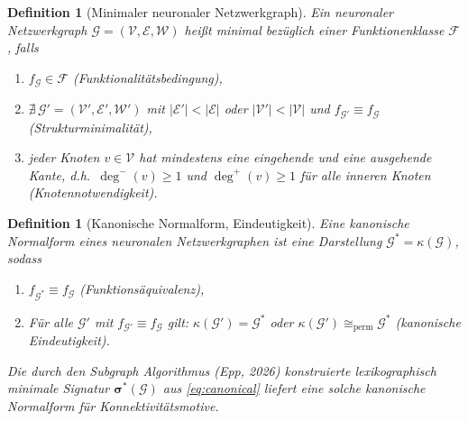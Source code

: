 ﻿\documentclass[12pt, a4paper, openany]{report}
\newtheorem{definition}[theorem]{Definition}
\newcommand{\calG}{\mathcal{G}}
\newcommand{\calV}{\mathcal{V}}
\newcommand{\calE}{\mathcal{E}}
\newcommand{\calW}{\mathcal{W}}
\newcommand{\calF}{\mathcal{F}}
\begin{document}
\begin{definition}[Minimaler neuronaler Netzwerkgraph]
\label{def:minimal_nngraph}
Ein neuronaler Netzwerkgraph $\calG = (\calV, \calE, \calW)$ heißt
\emph{minimal} bezüglich einer Funktionenklasse $\calF$, falls
\begin{enumerate}[label=(\roman*)]
  \item $f_\calG \in \calF$ (Funktionalitätsbedingung),
  \item $\nexists\, \calG' = (\calV', \calE', \calW')$ mit
        $|\calE'| < |\calE|$ oder $|\calV'| < |\calV|$ und
        $f_{\calG'} \equiv f_\calG$ (Strukturminimalität),
  \item jeder Knoten $v \in \calV$ hat mindestens eine eingehende und eine
        ausgehende Kante, d.h.\ $\deg^-(v) \geq 1$ und $\deg^+(v) \geq 1$
        für alle inneren Knoten (Knotennotwendigkeit).
\end{enumerate}
\end{definition}

\begin{definition}[Kanonische Normalform, Eindeutigkeit]
\label{def:canonical_normal_form}
Eine \emph{kanonische Normalform} eines neuronalen Netzwerkgraphen ist eine
Darstellung $\calG^* = \kappa(\calG)$, sodass
\begin{enumerate}[label=(\roman*)]
  \item $f_{\calG^*} \equiv f_\calG$ (Funktionsäquivalenz),
  \item Für alle $\calG'$ mit $f_{\calG'} \equiv f_\calG$ gilt:
        $\kappa(\calG') = \calG^*$ oder $\kappa(\calG') \cong_{\mathrm{perm}} \calG^*$
        (kanonische Eindeutigkeit).
\end{enumerate}
Die durch den Subgraph Algorithmus (Epp, 2026) konstruierte \emph{lexikographisch
minimale Signatur} $\bm{\sigma}^*(\calG)$ aus \eqref{eq:canonical} liefert
eine solche kanonische Normalform für Konnektivitätsmotive.
\end{definition}
\end{document}
